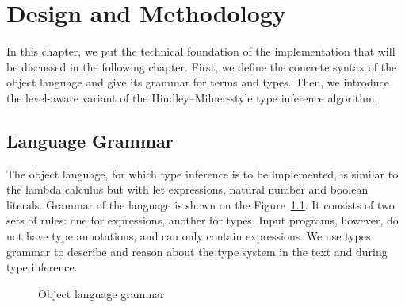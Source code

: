 \chapter{Design and Methodology}
\label{chap:methodology}

In this chapter, we put the technical foundation of the implementation that will be discussed in the following chapter. First, we define the concrete syntax of the object language and give its grammar for terms and types. Then, we introduce the level-aware variant of the Hindley–Milner-style type inference algorithm.

\section{Language Grammar}

The object language, for which type inference is to be implemented, is similar to the lambda calculus but with let expressions, natural number and boolean literals. Grammar of the language is shown on the Figure~\ref{fig:object-language-grammar}. It consists of two sets of rules: one for expressions, another for types. Input programs, however, do not have type annotations, and can only contain expressions. We use types grammar to describe and reason about the type system in the text and during type inference.

\begin{figure}[H]
  \caption{Object language grammar}
  \label{fig:object-language-grammar}
\end{figure}

